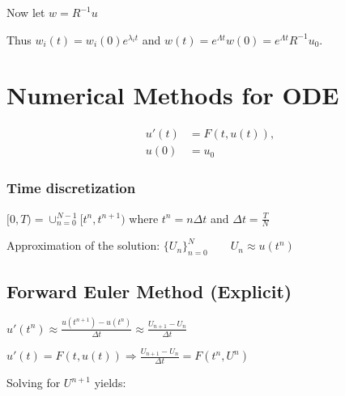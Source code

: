 \documentclass[10pt,a4paper]{scrartcl}
\begin{document}
\begin{multicols*}{3}
Now let $w=R^{-1}u$


Thus $w_i(t)=w_i(0)e^{\lambda_i t}$ and $w(t)=e^{\Lambda t}w(0)=e^{\Lambda t}R^{-1}u_0$.



\section{Numerical Methods for ODE}

\begin{align*}
u'(t)&=F(t,u(t)),\\
u(0)&=u_0
\end{align*}


\subsubsection{Time discretization}

$[0,T)=\cup_{n=0}^{N-1}[t^n,t^{n+1})$ where $t^n=n\Delta t$ and $\Delta t = \frac{T}{N}$

Approximation of the solution: $\{U_n\}^N_{n=0}\qquad U_n\approx u(t^n)$

\subsection{Forward Euler Method (Explicit)}

\begin{center}
$u'(t^n)\approx\frac{u(t^{n+1})-u(t^n)}{\Delta t}\approx\frac{U_{n+1}-U_n}{\Delta t}$
\end{center}


$u'(t)=F(t,u(t)) \Longrightarrow \frac{U_{n+1}-U_n}{\Delta t}=F(t^n,U^n)$

Solving for $U^{n+1}$ yields:



\end{multicols*}
\end{document}
